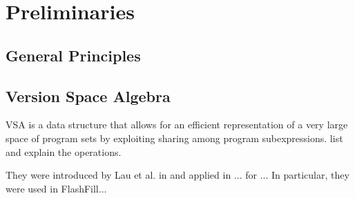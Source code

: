 \chapter{Preliminaries}
\label{chapter:preliminaries}

\section{General Principles}
\label{sec:general-principles}




\section{Version Space Algebra}
\label{sec:vsa}

\ac{VSA} is a data structure that allows for an efficient representation of a
very large space of program sets by exploiting sharing among program
subexpressions.  {list and explain the operations}.

They were introduced by Lau et al. in \cite{Lau:2000} and applied in ... for ...
In particular, they were used in FlashFill...


